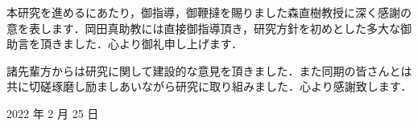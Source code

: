 \newpage
\changeindent{0cm}
\acknowledgements
\changeindent{2cm}
本研究を進めるにあたり，御指導，御鞭撻を賜りました森直樹教授に深く感謝の意を表します．岡田真助教には直接御指導頂き，研究方針を初めとした多大な御助言を頂きました．心より御礼申し上げます．\par
諸先輩方からは研究に関して建設的な意見を頂きました．また同期の皆さんとは共に切磋琢磨し励ましあいながら研究に取り組みました．心より感謝致します．\par


\begin{flushright}
 2022 年 2 月 25 日
\end{flushright}
